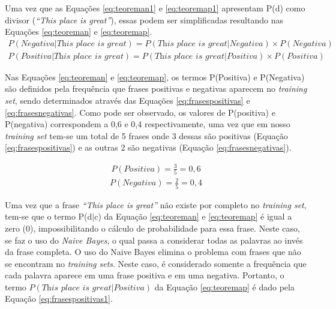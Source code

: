 Uma vez que as Equações \ref{eq:teoreman1} e \ref{eq:teoremap1}
apresentam P(d) como divisor (\textit{``This place is great''}), essas podem ser
simplificadas resultando nas Equações \ref{eq:teoreman} e \ref{eq:teoremap}.
\begin{equation}
\begin{gathered}
P(Negativa|\textit{This place is great})
=
P(\textit{This place is great}|Negativa) \times
P(Negativa)
\label{eq:teoreman}
\end{gathered}
\end{equation}
\begin{equation}
\begin{gathered}
P(Positiva|\textit{This place is great})
=
P(\textit{This place is great}|Positiva) \times
P(Positiva)
\label{eq:teoremap}
\end{gathered}
\end{equation}



Nas Equações \ref{eq:teoreman} e \ref{eq:teoremap}, os termos P(Positiva) e
P(Negativa) são definidos pela frequência que frases positivas e negativas aparecem no \textit{training set}, sendo determinados
através das Equações \ref{eq:frasespositivas} e \ref{eq:frasesnegativas}. Como
pode ser observado, os valores de P(positiva) e P(negativa) correspondem a 0,6
e 0,4 respectivamente, uma vez que em nosso \textit{training set} tem-se um
total de 5 frases onde 3 dessas são positivas (Equação \ref{eq:frasespositivas})
e as outras 2 são negativas (Equação \ref{eq:frasesnegativas}).

\begin{equation}
\begin{gathered}
P(Positiva)
=
\frac{3}{5} = 0,6
\label{eq:frasespositivas}
\end{gathered}
\end{equation}
\begin{equation}
\begin{gathered}
P(Negativa)
=
\frac{2}{5} = 0,4
\label{eq:frasesnegativas}
\end{gathered}
\end{equation}

Uma vez que a frase \textit{``This place is great''} não existe por completo no
\textit{training set}, tem-se que o termo P(d$\vert$c) da Equação
\ref{eq:teoreman} e \ref{eq:teoremap} é igual a zero (0), impossibilitando o
cálculo de probabilidade para essa frase. Neste caso, se faz o uso do
\textit{Naive Bayes}, o qual passa a considerar todas as palavras ao invés da
frase completa. O uso do Naive Bayes elimina o problema com frases que não se
encontram no \textit{training sets}. Neste caso, é considerado somente a
frequência que cada palavra aparece em uma frase positiva e em uma negativa.
Portanto, o termo $P(\textit{This place is
great}|Positiva)$ da Equação \ref{eq:teoremap} é dado pela Equação
\ref{eq:frasespositivas1}.


